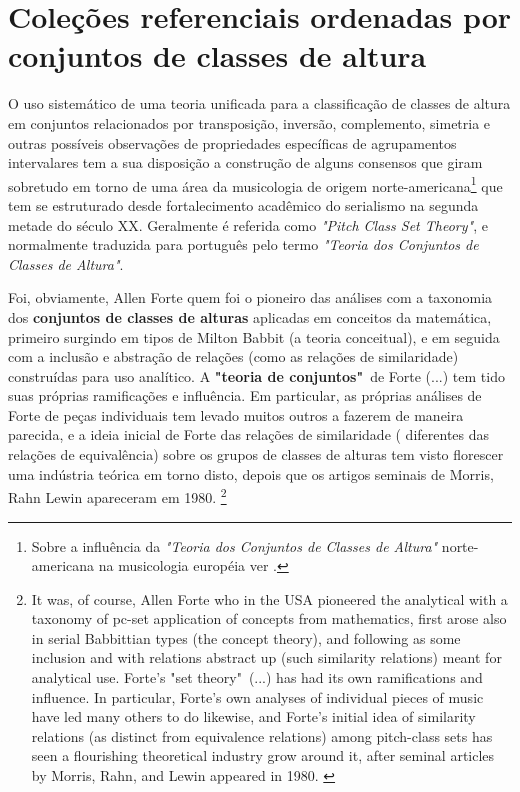 \documentclass[
	12pt,				%
	openright,			%
	twoside,			%
	a4paper,			%
	english,			%
	french,				%
	spanish,			%
	brazil				%
	]{abntex2}
\begin{document}
\section{Coleções referenciais ordenadas por conjuntos de classes de altura}

O uso sistemático de uma teoria unificada para a classificação de classes de altura em conjuntos relacionados por transposição, inversão, complemento, simetria e outras possíveis observações de propriedades específicas de agrupamentos intervalares tem a sua disposição a construção de alguns consensos que giram sobretudo em torno de uma área da musicologia de origem norte-americana\footnote{Sobre a influência da \textit{"Teoria dos Conjuntos de Classes de Altura"} norte-americana na musicologia européia ver .} que tem se estruturado desde fortalecimento acadêmico do serialismo na segunda metade do século XX. Geralmente é referida como \textit{"Pitch Class Set Theory"}, e normalmente traduzida para português pelo termo \textit{"Teoria dos Conjuntos de Classes de Altura"}\cite{straus2004}.

\begin{citacao}
Foi, obviamente, Allen Forte quem foi o pioneiro das análises com a taxonomia dos \textbf{conjuntos de classes de alturas} aplicadas em conceitos da matemática, primeiro surgindo em tipos de Milton Babbit (a teoria conceitual), e em seguida com a inclusão e abstração de relações (como as relações de similaridade) construídas para uso analítico. A \textbf{"teoria de conjuntos"}\ de Forte (...) tem tido suas próprias ramificações e influência. Em particular, as próprias análises de Forte de peças individuais tem levado muitos outros a fazerem de maneira parecida, e a ideia inicial de Forte das relações de similaridade ( diferentes das relações de equivalência) sobre os grupos de classes de alturas tem visto florescer uma indústria teórica em torno disto, depois que os artigos seminais de Morris, Rahn  Lewin apareceram em 1980. \cite[p.  130]{rahn2004swerve}\footnote{
It was, of course, Allen Forte who in the USA pioneered the analytical with a taxonomy of pc-set application of concepts from mathematics, first arose also in serial Babbittian types (the concept theory), and following as some inclusion and with relations abstract up (such similarity relations) meant for analytical use. Forte's "set theory"\  (...) has had its own ramifications and influence. In particular, Forte's own analyses of individual pieces of music have led many others to do likewise, and Forte's initial idea of similarity relations (as distinct from equivalence relations) among pitch-class sets has seen a flourishing theoretical industry grow around it, after seminal articles by Morris, Rahn, and Lewin appeared in 1980. \cite[p.  130, grifo nossos]{rahn2004swerve}}
\end{citacao}
\end{document}

